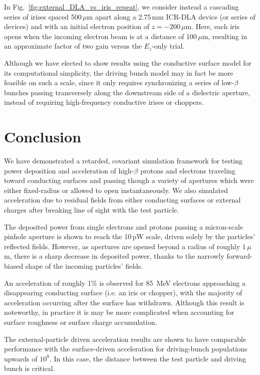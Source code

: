\documentclass[reprint,
               amsmath,amssymb,nofootinbib, aps%
              ]{revtex4-2}
\begin{document}
In Fig.~\ref{fig:external_DLA_vs_iris_repeat}, we consider instead a cascading series of irises spaced 500\,{$\mu$}m apart along a 2.75\,mm ICR-DLA device (or series of devices) and with an initial electron position of $z=-200\,\mu$m. Here, each iris opens when the incoming electron beam is at a distance of 100\,{$\mu$}m, resulting in an approximate factor of two gain versus the $E_z$-only trial.

Although we have elected to show results using the conductive surface model for its computational simplicity, the driving bunch model may in fact be more feasible on such a scale, since it only requires synchronizing a series of low-$\beta$ bunches passing transversely along the downstream side of a dielectric aperture, instead of requiring high-frequency conductive irises or choppers.


\section{Conclusion}
We have demonstrated a retarded, covariant simulation framework for testing power deposition and acceleration of high-$\beta$ protons and electrons traveling toward conducting surfaces and passing though a variety of apertures which were either fixed-radius or allowed to open instantaneously. We also simulated acceleration due to residual fields from either conducting surfaces or external charges after breaking line of sight with the test particle.

The deposited power from single electrons and protons passing a micron-scale pinhole aperture is shown to reach the 10\,pW scale, driven solely by the particles' reflected fields. However, as apertures are opened beyond a radius of roughly $1\,\mu$m, there is a sharp decrease in deposited power, thanks to the narrowly forward-biased shape of the incoming particles' fields. 

An acceleration of roughly 1\% is observed for 85~MeV electrons approaching a disappearing conducting surface (i.e. an iris or chopper), with the majority of acceleration occurring after the surface has withdrawn. Although this result is noteworthy, in practice it is may be more complicated when accounting for surface roughness or surface charge accumulation.

The external-particle driven acceleration results are shown to have comparable performance with the surface-driven acceleration for driving-bunch populations upwards of $10^8$. In this case, the distance between the test particle and driving bunch is critical.
\end{document}
